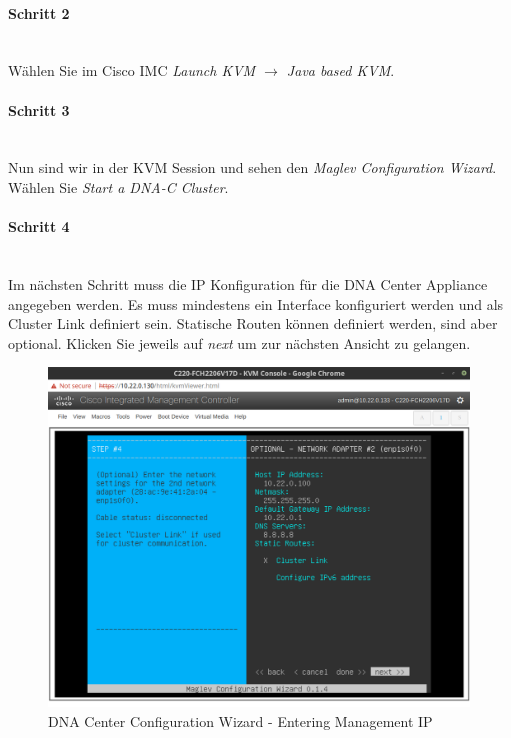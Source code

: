 \paragraph{Schritt 2}
~\\
Wählen Sie im Cisco IMC \textit{Launch KVM $\rightarrow$ Java based KVM}.

\paragraph{Schritt 3}
~\\
Nun sind wir in der KVM Session und sehen den \textit{Maglev Configuration Wizard}. Wählen Sie \textit{Start a DNA-C Cluster}.

\paragraph{Schritt 4}
~\\
Im nächsten Schritt muss die IP Konfiguration für die DNA Center Appliance angegeben werden. Es muss mindestens ein Interface konfiguriert werden und als Cluster Link definiert sein. Statische Routen können definiert werden, sind aber optional. Klicken Sie jeweils auf \textit{next} um zur nächsten Ansicht zu gelangen.

\begin{figure}[H]
	\centering
	\includegraphics[height=9cm]{img/sc_002.png}
	\caption{DNA Center Configuration Wizard - Entering Management IP}
	\label{fig:installguide-dna-center-install-step-4}
\end{figure} 

